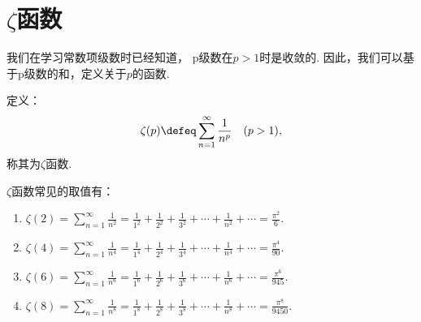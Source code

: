 \section{\texorpdfstring{\(\zeta\)}{\textzeta}函数}
我们在学习常数项级数时已经知道，
p级数在\(p>1\)时是收敛的.
因此，我们可以基于p级数的和，定义关于\(p\)的函数.
\begin{definition}
定义：\[
	\zeta(p)
	\defeq
	\sum\limits_{n=1}^\infty \frac{1}{n^p}
	\quad(p>1),
\]
称其为\(\zeta\)函数.
\end{definition}

\begin{proposition}
\def\zetafunc#1{\zeta(#1)%
	= \sum\limits_{n=1}^\infty \frac{1}{n^{#1}}%
	= \frac{1}{1^{#1}}%
		+\frac{1}{2^{#1}}%
		+\frac{1}{3^{#1}}%
		+\dotsb%
		+\frac{1}{n^{#1}}%
		+\dotsb}%
\(\zeta\)函数常见的取值有：\begin{enumerate}
	\item \(\zetafunc{2} = \frac{\pi^2}{6}\).
	\item \(\zetafunc{4} = \frac{\pi^4}{90}\).
	\item \(\zetafunc{6} = \frac{\pi^6}{945}\).
	\item \(\zetafunc{8} = \frac{\pi^8}{9450}\).
\end{enumerate}
\end{proposition}
